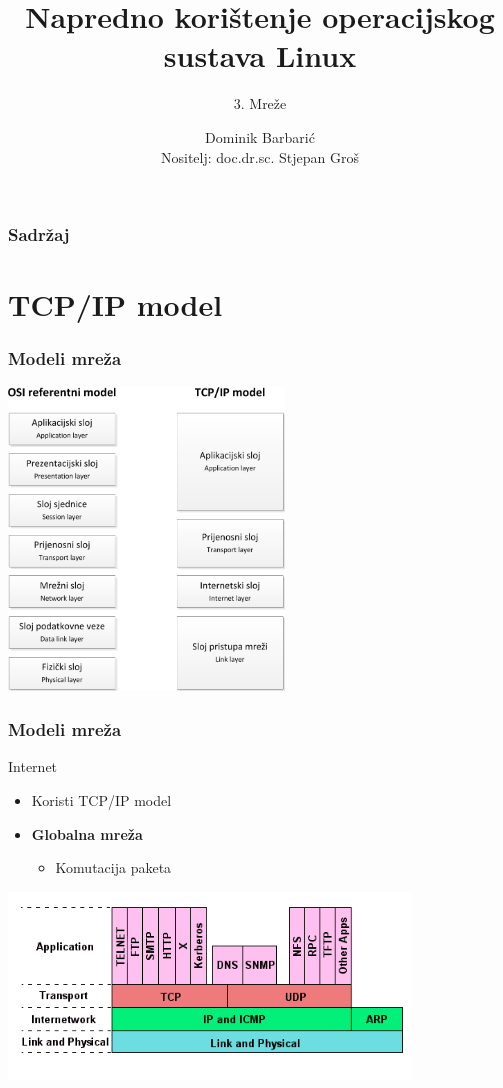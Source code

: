 \documentclass[t,table,usenames,dvipsnames]{beamer}
\date{\todayiso}
\title[NKOSL]{Napredno korištenje operacijskog sustava Linux}
\author[Dominik Barbarić]{Dominik Barbarić\\{\small Nositelj: doc.dr.sc. Stjepan Groš}}
\subtitle{3. Mreže}
\institute[FER]{Sveučilište u Zagrebu\\Fakultet elektrotehnike i računarstva}
\begin{document}
{
	\begin{frame}
		\maketitle
	\end{frame}
}

\begin{frame}
	\frametitle{Sadržaj}
	\tableofcontents
\end{frame}

\section{TCP/IP model}

\begin{frame}
	\frametitle{Modeli mreža}
	\centering
	\includegraphics[width=0.55\textwidth]{osi_tcpip.png}
\end{frame}

\begin{frame}
	\frametitle{Modeli mreža}
	Internet
	\begin{itemize}
		\item Koristi TCP/IP model
		\item \textbf{Globalna mreža}
		\begin{itemize}
			\item Komutacija paketa
		\end{itemize}
	\end{itemize}
	\vfill
	\includegraphics[width=0.8\textwidth]{service_layer.png}
\end{frame}
\end{document}
